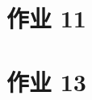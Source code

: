 \documentclass[\ROOT/main.tex]{subfiles}
\begin{document}
\section{作业 11}

\section{作业 13}

\end{document}
